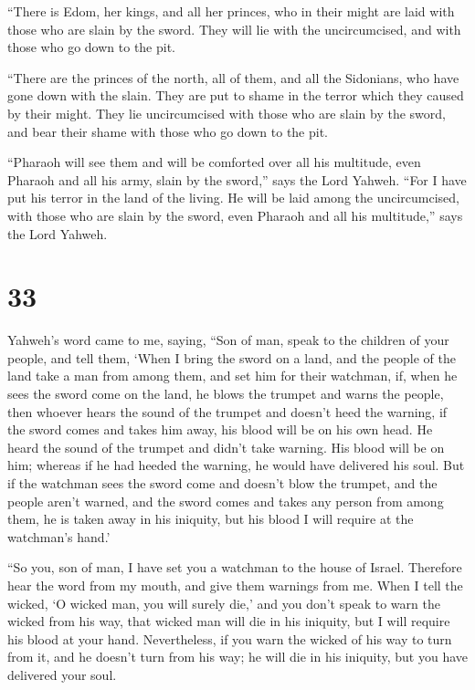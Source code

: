  ``There is Edom, her kings, and all her princes, who in
their might are laid with those who are slain by the sword. They will
lie with the uncircumcised, and with those who go down to the pit.

 ``There are the princes of the north, all of them, and all
the Sidonians, who have gone down with the slain. They are put to shame
in the terror which they caused by their might. They lie uncircumcised
with those who are slain by the sword, and bear their shame with those
who go down to the pit.

 ``Pharaoh will see them and will be comforted over all his
multitude, even Pharaoh and all his army, slain by the sword,'' says the
Lord Yahweh.  ``For I have put his terror in the land of
the living. He will be laid among the uncircumcised, with those who are
slain by the sword, even Pharaoh and all his multitude,'' says the Lord
Yahweh.

\hypertarget{section-31}{%
\section{33}\label{section-31}}

 Yahweh's word came to me, saying,  ``Son of
man, speak to the children of your people, and tell them, `When I bring
the sword on a land, and the people of the land take a man from among
them, and set him for their watchman,  if, when he sees the
sword come on the land, he blows the trumpet and warns the people,
 then whoever hears the sound of the trumpet and doesn't
heed the warning, if the sword comes and takes him away, his blood will
be on his own head.  He heard the sound of the trumpet and
didn't take warning. His blood will be on him; whereas if he had heeded
the warning, he would have delivered his soul.  But if the
watchman sees the sword come and doesn't blow the trumpet, and the
people aren't warned, and the sword comes and takes any person from
among them, he is taken away in his iniquity, but his blood I will
require at the watchman's hand.'

 ``So you, son of man, I have set you a watchman to the
house of Israel. Therefore hear the word from my mouth, and give them
warnings from me.  When I tell the wicked, `O wicked man,
you will surely die,' and you don't speak to warn the wicked from his
way, that wicked man will die in his iniquity, but I will require his
blood at your hand.  Nevertheless, if you warn the wicked of
his way to turn from it, and he doesn't turn from his way; he will die
in his iniquity, but you have delivered your soul.

